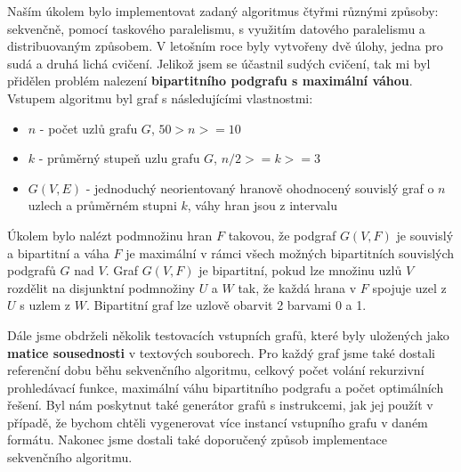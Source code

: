 Naším úkolem bylo implementovat zadaný algoritmus čtyřmi různými způsoby: sekvenčně, pomocí taskového paralelismu, s využitím datového paralelismu a distribuovaným způsobem.
V letošním roce byly vytvořeny dvě úlohy, jedna pro sudá a druhá lichá cvičení.
Jelikož jsem se účastnil sudých cvičení, tak mi byl přidělen problém nalezení \textbf{bipartitního podgrafu s maximální váhou}.
Vstupem algoritmu byl graf s následujícími vlastnostmi:

\begin{itemize}
    \item \(n\) - počet uzlů grafu \(G\), \(50 > n >= 10\)
    \item \(k\) - průměrný stupeň uzlu grafu \(G\), \(n/2 >= k >= 3\)
    \item \(G(V,E)\) - jednoduchý neorientovaný hranově ohodnocený souvislý graf o \(n\) uzlech a průměrném stupni \(k\), váhy hran jsou z intervalu \(<80,120>\)
\end{itemize}

Úkolem bylo nalézt podmnožinu hran \(F\) takovou, že podgraf \(G(V,F)\) je souvislý a bipartitní a váha \(F\) je maximální v rámci všech možných bipartitních souvislých podgrafů \(G\) nad \(V\).
Graf \(G(V,F)\) je bipartitní, pokud lze množinu uzlů \(V\) rozdělit na disjunktní podmnožiny \(U\) a \(W\) tak, že každá hrana v \(F\) spojuje uzel z \(U\) s uzlem z \(W\).
Bipartitní graf lze uzlově obarvit 2 barvami 0 a 1.

Dále jsme obdrželi několik testovacích vstupních grafů, které byly uložených jako \textbf{matice sousednosti} v textových souborech.
Pro každý graf jsme také dostali referenční dobu běhu sekvenčního algoritmu, celkový počet volání rekurzivní prohledávací funkce, maximální váhu bipartitního podgrafu a počet optimálních řešení.
Byl nám poskytnut také generátor grafů s instrukcemi, jak jej použít v případě, že bychom chtěli vygenerovat více instancí vstupního grafu v daném formátu.
Nakonec jsme dostali také doporučený způsob implementace sekvenčního algoritmu.